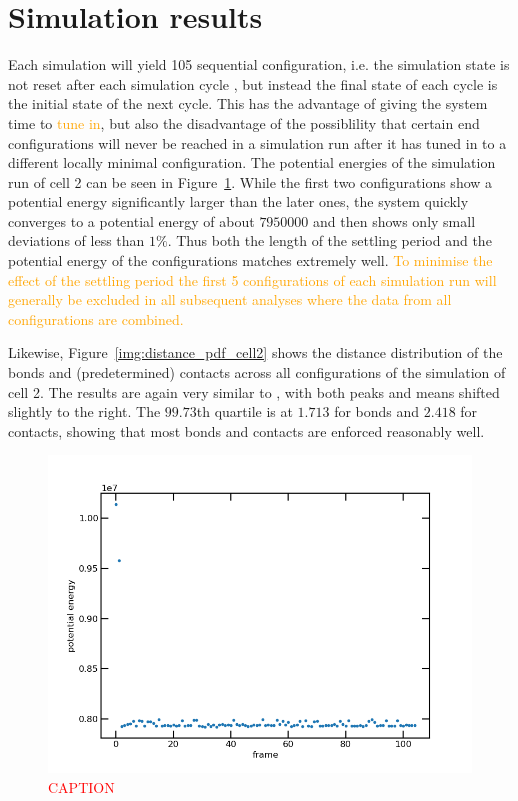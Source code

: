 \documentclass[a4paper,11pt,oneside,final,english,toc=bib,draft]{scrbook}
\begin{document}

\section{Simulation results} %
\label{sec:simulation_results}

Each simulation will yield 105 sequential configuration, i.e. the simulation state is not reset after each simulation cycle , but instead the final state of each cycle is the initial state of the next cycle. This has the advantage of giving the system time to \textcolor{orange}{tune in}, but also the disadvantage of the possiblility that certain end configurations will never be reached in a simulation run after it has tuned in to a different locally minimal configuration. The potential energies of the simulation run of cell 2 can be seen in Figure~\ref{img:potential_energy_cell2}. While the first two configurations show a potential energy significantly larger than the later ones, the system quickly converges to a potential energy of about \(\num{7950000}\) and then shows only small deviations of less than \(1 \%\). Thus both the length of the settling period and the potential energy of the configurations matches \cite{wettermann_minimal_2020} extremely well. \textcolor{orange}{To minimise the effect of the settling period the first 5 configurations of each simulation run will generally be excluded in all subsequent analyses where the data from all configurations are combined.}

Likewise, Figure~\ref{img:distance_pdf_cell2} shows the distance distribution of the bonds and (predetermined) contacts across all configurations of the simulation of cell 2. The results are again very similar to \cite{wettermann_minimal_2020}, with both peaks and means shifted slightly to the right. The \(99.73\)th quartile is at \(1.713\) for bonds and \(2.418\) for contacts, showing that most bonds and contacts are enforced reasonably well.

\begin{figure}[ht]
\centering
  \includegraphics[width=12cm]{potential_energy_cell2.png}
  \caption{\textcolor{red}{CAPTION}}
  \label{img:potential_energy_cell2}
\end{figure}
\end{document}
